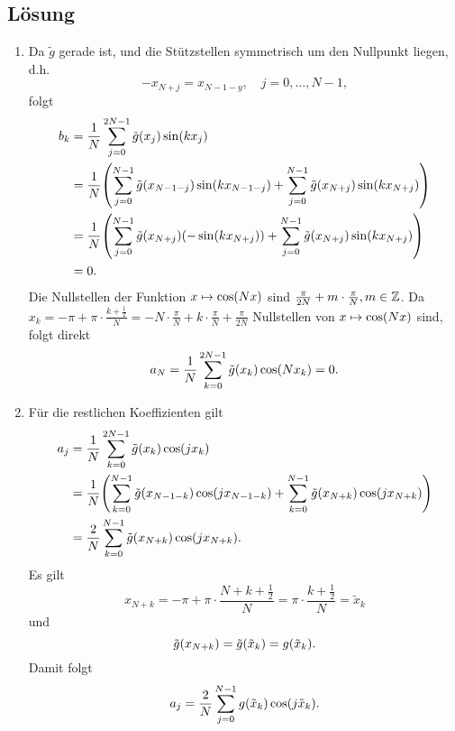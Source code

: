 \documentclass{exercise}
\begin{document}
    \subsection*{Lösung}
    \begin{enumerate}
        \item Da \(\tilde{g}\) gerade ist, und die Stützstellen symmetrisch um den Nullpunkt liegen, d.h.
        \[
            -x_{N + j} = x_{N - 1 - y}, \quad j = 0, \ldots, N - 1,
        \]
        folgt
        \begin{align*}
            b_k &= \frac{1}{N}\sum_{j = 0}^{2N - 1}\tilde{g}\parentheses*{x_j}\sin\parentheses*{kx_j}\\
            &= \frac{1}{N}\parentheses*{\sum_{j = 0}^{N - 1}\tilde{g}\parentheses*{x_{N - 1 - j}}\sin\parentheses*{kx_{N - 1 - j}} + \sum_{j = 0}^{N - 1}\tilde{g}\parentheses*{x_{N + j}}\sin\parentheses*{kx_{N + j}}}\\
            &= \frac{1}{N}\parentheses*{\sum_{j = 0}^{N - 1}\tilde{g}\parentheses*{x_{N + j}}\parentheses*{-\sin\parentheses*{kx_{N + j}}} + \sum_{j = 0}^{N - 1}\tilde{g}\parentheses*{x_{N + j}}\sin\parentheses*{kx_{N + j}}}\\
            &= 0.
        \end{align*}
        Die Nullstellen der Funktion \(x \mapsto \cos\parentheses*{Nx}\) sind \(\frac{\pi}{2N} + m \cdot \frac{\pi}{N}, m \in \mathbb{Z}\).
        Da \(x_k = -\pi + \pi \cdot \frac{k + \frac{1}{2}}{N} = -N \cdot \frac{\pi}{N} + k \cdot \frac{\pi}{N} + \frac{\pi}{2N}\) Nullstellen von \(x \mapsto \cos\parentheses*{Nx}\) sind, folgt direkt
        \[
            a_N = \frac{1}{N}\sum_{k = 0}^{2N - 1}\tilde{g}\parentheses*{x_k}\cos\parentheses*{Nx_k} = 0.
        \]
        \item Für die restlichen Koeffizienten gilt
        \begin{align*}
            a_j &= \frac{1}{N}\sum_{k = 0}^{2N - 1}\tilde{g}\parentheses*{x_k}\cos\parentheses*{jx_k}\\
            &= \frac{1}{N}\parentheses*{\sum_{k = 0}^{N - 1}\tilde{g}\parentheses*{x_{N - 1 - k}}\cos\parentheses*{jx_{N - 1 - k}} + \sum_{k = 0}^{N - 1}\tilde{g}\parentheses*{x_{N + k}}\cos\parentheses*{jx_{N + k}}}\\
            &= \frac{2}{N}\sum_{k = 0}^{N - 1}\tilde{g}\parentheses*{x_{N + k}}\cos\parentheses*{jx_{N + k}}.
        \end{align*}
        Es gilt
        \[
            x_{N + k} = -\pi + \pi \cdot \frac{N + k + \frac{1}{2}}{N} = \pi \cdot \frac{k + \frac{1}{2}}{N} = \tilde{x}_k
        \]
        und
        \[
            \tilde{g}\parentheses*{x_{N + k}} = \tilde{g}\parentheses*{\tilde{x}_k} = g\parentheses*{\tilde{x}_k}.
        \]
        Damit folgt
        \[
            a_j = \frac{2}{N}\sum_{j = 0}^{N - 1}g\parentheses*{\tilde{x}_k}\cos\parentheses*{j\tilde{x}_k}.
        \]
    \end{enumerate}
\end{document}
